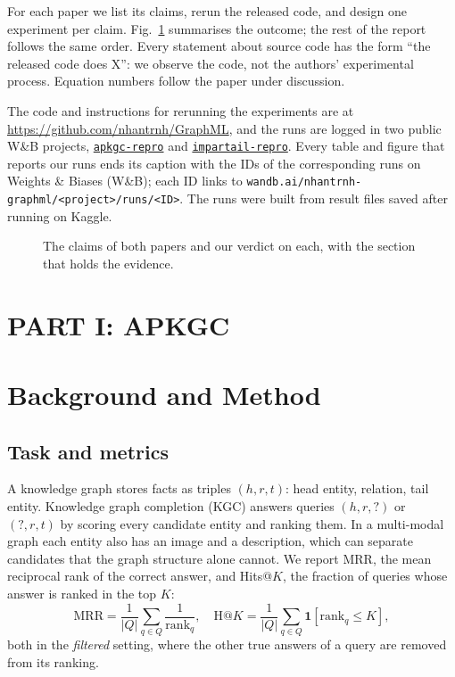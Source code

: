 \documentclass[conference,a4paper]{IEEEtran}
\newcommand{\repo}{\url{https://github.com/nhantrnh/GraphML}}
\begin{document}
For each paper we list its claims, rerun the released code, and design one experiment per
claim. Fig.~\ref{fig:verdicts} summarises the outcome; the rest of the report follows the
same order. Every statement about source code has the form ``the released code does X'':
we observe the code, not the authors' experimental process. Equation numbers follow the
paper under discussion.

The code and instructions for rerunning the experiments are at \repo, and the runs are
logged in two public W\&B projects,
\href{https://wandb.ai/nhantrnh-graphml/apkgc-repro}{\nolinkurl{apkgc-repro}} and
\href{https://wandb.ai/nhantrnh-graphml/impartail-repro}{\nolinkurl{impartail-repro}}. Every table and figure that
reports our runs ends its caption with the IDs of the corresponding runs on Weights \&
Biases (W\&B); each ID links to \nolinkurl{wandb.ai/nhantrnh-graphml/<project>/runs/<ID>}.
The runs were built from result files saved after running on Kaggle.

\begin{figure}[!t]
\centering
\resizebox{\textwidth}{!}{}
\caption{The claims of both papers and our verdict on each, with the section that holds the evidence.}
\label{fig:verdicts}
\end{figure}

\section*{PART I: APKGC}

\section{Background and Method}
\subsection{Task and metrics}
A knowledge graph stores facts as triples $(h,r,t)$: head entity, relation, tail entity.
Knowledge graph completion (KGC) answers queries $(h,r,?)$ or $(?,r,t)$ by scoring every
candidate entity and ranking them. In a multi-modal graph each entity also has an image
and a description, which can separate candidates that the graph structure alone cannot.
We report MRR, the mean reciprocal rank of the correct answer, and Hits@$K$, the fraction
of queries whose answer is ranked in the top $K$:
\begin{equation*}
\mathrm{MRR}=\frac{1}{|Q|}\sum_{q\in Q}\frac{1}{\mathrm{rank}_q},\quad
\mathrm{H@}K=\frac{1}{|Q|}\sum_{q\in Q}\mathbf{1}[\mathrm{rank}_q\le K],
\end{equation*}
both in the \emph{filtered} setting, where the other true answers of a query are removed
from its ranking.
\end{document}
